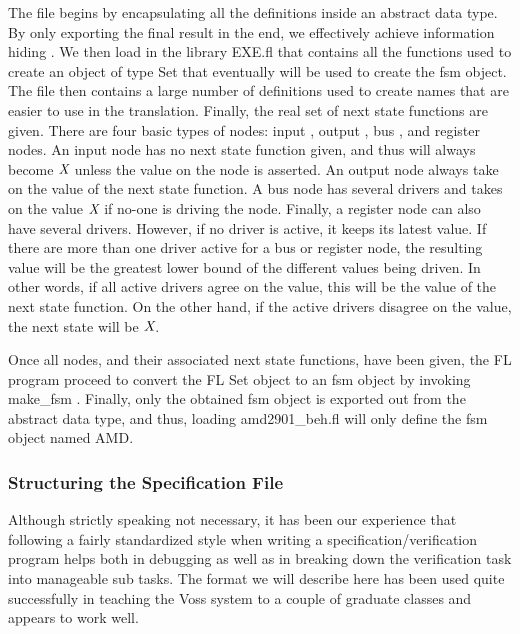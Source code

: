 The file begins by encapsulating all the definitions inside an abstract
data type.
By only exporting the final result in the end, we effectively achieve
information hiding%
%
{}.
We then load in the library EXE.fl that contains all the functions
used to create an object of type Set that eventually will be used
to create the fsm object.
The file then contains a large number of definitions used to
create names that are easier to use in the translation.
Finally, the real set of next state functions are given.
There are four basic types of nodes: input%
%
{}, output%
%
{}, bus%
%
{}, and
register%
%
{} nodes.
An input node has no next state function%
%
{} given, and thus will always
become $\mbox{\em X}$ unless the value on the node is asserted.
An output node always take on the value of the next state function.
A bus node has several drivers%
%
{} and takes on the value $\mbox{\em X}$ if
no-one is driving the node.
Finally, a register node can also have several drivers.
However, if no driver is active, it keeps its latest value.
If there are more than one driver active for a bus or register node, the
resulting value will be the greatest lower bound%
%
{} of the different values
being driven.
In other words, if all active drivers agree on the value, this will
be the value of the next state function.
On the other hand, if the active drivers disagree on the value, the
next state will be $\mbox{\em X}$.

Once all nodes, and their associated next state functions, have
been given, the FL program proceed to convert the FL Set object to an
fsm object by invoking make\_fsm%
%
{}.
Finally, only the obtained fsm object is exported out from the abstract
data type, and thus, loading amd2901\_beh.fl will only define
the fsm object named AMD.

\subsubsection{Structuring the Specification File}

Although strictly speaking not necessary, it has been our experience
that following a fairly standardized style%
%
{} when writing a
specification/verification program helps both in debugging as well
as in breaking down the verification task into manageable sub tasks. 
The format we will describe here has been used quite successfully in
teaching the Voss system to a couple of graduate classes
and appears to work well.

